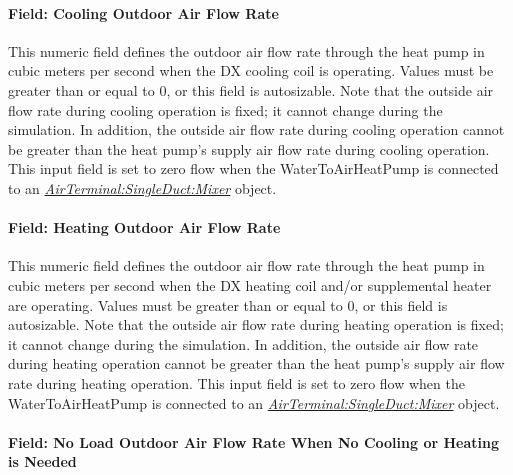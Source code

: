 \paragraph{Field: Cooling Outdoor Air Flow Rate}\label{field-cooling-outdoor-air-flow-rate-2}

This numeric field defines the outdoor air flow rate through the heat pump in cubic meters per second when the DX cooling coil is operating. Values must be greater than or equal to 0, or this field is autosizable. Note that the outside air flow rate during cooling operation is fixed; it cannot change during the simulation. In addition, the outside air flow rate during cooling operation cannot be greater than the heat pump's supply air flow rate during cooling operation. This input field is set to zero flow when the WaterToAirHeatPump is connected to an \textit{\hyperref[airterminalsingleductmixer]{AirTerminal:SingleDuct:Mixer}} object.

\paragraph{Field: Heating Outdoor Air Flow Rate}\label{field-heating-outdoor-air-flow-rate-2}

This numeric field defines the outdoor air flow rate through the heat pump in cubic meters per second when the DX heating coil and/or supplemental heater are operating. Values must be greater than or equal to 0, or this field is autosizable. Note that the outside air flow rate during heating operation is fixed; it cannot change during the simulation. In addition, the outside air flow rate during heating operation cannot be greater than the heat pump's supply air flow rate during heating operation. This input field is set to zero flow when the WaterToAirHeatPump is connected to an \textit{\hyperref[airterminalsingleductmixer]{AirTerminal:SingleDuct:Mixer}} object.

\paragraph{Field: No Load Outdoor Air Flow Rate When No Cooling or Heating is Needed}\label{field-no-load-outdoor-air-flow-rate-when-no-cooling-or-heating-is-needed-000}

